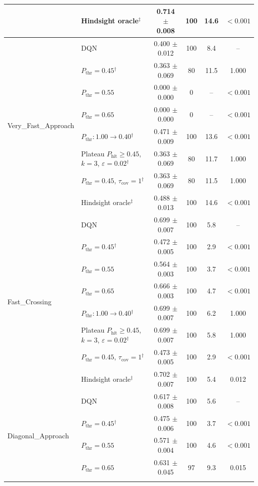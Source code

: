 \begin{table}[htbp]
\begin{tabular}{llcccc}
 & Hindsight oracle$^{\ddagger}$ & 0.714 $\pm$ 0.008 & 100 & 14.6 & $<0.001$ \\
\midrule
\multirow{8}{*}{Very\_Fast\_Approach} & DQN & 0.400 $\pm$ 0.012 & 100 & 8.4 & -- \\
 & $P_{\mathrm{thr}}=0.45$$^{\dagger}$ & 0.363 $\pm$ 0.069 & 80 & 11.5 & 1.000 \\
 & $P_{\mathrm{thr}}=0.55$ & 0.000 $\pm$ 0.000 & 0 & -- & $<0.001$ \\
 & $P_{\mathrm{thr}}=0.65$ & 0.000 $\pm$ 0.000 & 0 & -- & $<0.001$ \\
 & $P_{\mathrm{thr}}: 1.00 \to 0.40$$^{\dagger}$ & 0.471 $\pm$ 0.009 & 100 & 13.6 & $<0.001$ \\
 & Plateau $P_{\mathrm{hit}}\geq0.45$, $k=3$, $\varepsilon=0.02$$^{\dagger}$ & 0.363 $\pm$ 0.069 & 80 & 11.7 & 1.000 \\
 & $P_{\mathrm{thr}}=0.45$, $\tau_{\mathrm{cov}}=1$$^{\dagger}$ & 0.363 $\pm$ 0.069 & 80 & 11.5 & 1.000 \\
 & Hindsight oracle$^{\ddagger}$ & 0.488 $\pm$ 0.013 & 100 & 14.6 & $<0.001$ \\
\midrule
\multirow{8}{*}{Fast\_Crossing} & DQN & 0.699 $\pm$ 0.007 & 100 & 5.8 & -- \\
 & $P_{\mathrm{thr}}=0.45$$^{\dagger}$ & 0.472 $\pm$ 0.005 & 100 & 2.9 & $<0.001$ \\
 & $P_{\mathrm{thr}}=0.55$ & 0.564 $\pm$ 0.003 & 100 & 3.7 & $<0.001$ \\
 & $P_{\mathrm{thr}}=0.65$ & 0.666 $\pm$ 0.003 & 100 & 4.7 & $<0.001$ \\
 & $P_{\mathrm{thr}}: 1.00 \to 0.40$$^{\dagger}$ & 0.699 $\pm$ 0.007 & 100 & 6.2 & 1.000 \\
 & Plateau $P_{\mathrm{hit}}\geq0.45$, $k=3$, $\varepsilon=0.02$$^{\dagger}$ & 0.699 $\pm$ 0.007 & 100 & 5.8 & 1.000 \\
 & $P_{\mathrm{thr}}=0.45$, $\tau_{\mathrm{cov}}=1$$^{\dagger}$ & 0.473 $\pm$ 0.005 & 100 & 2.9 & $<0.001$ \\
 & Hindsight oracle$^{\ddagger}$ & 0.702 $\pm$ 0.007 & 100 & 5.4 & 0.012 \\
\midrule
\multirow{8}{*}{Diagonal\_Approach} & DQN & 0.617 $\pm$ 0.008 & 100 & 5.6 & -- \\
 & $P_{\mathrm{thr}}=0.45$$^{\dagger}$ & 0.475 $\pm$ 0.006 & 100 & 3.7 & $<0.001$ \\
 & $P_{\mathrm{thr}}=0.55$ & 0.571 $\pm$ 0.004 & 100 & 4.6 & $<0.001$ \\
 & $P_{\mathrm{thr}}=0.65$ & 0.631 $\pm$ 0.045 & 97 & 9.3 & 0.015 \\
$$
\end{tabular}
\end{table}
